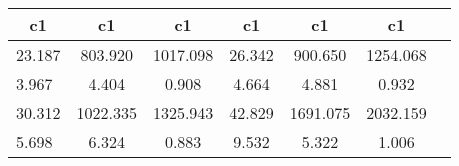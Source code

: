 \begin{table}[htbp]
\begin{tabular}{lcccccc} \hline \hline
 \multicolumn{1}{c}{ c1 }  & c1  & c1  & c1  & c1  & c1  \\  \hline 
   23.187 &   803.920 &  1017.098 &    26.342 &   900.650 &  1254.068 \\  
    3.967 &     4.404 &     0.908 &     4.664 &     4.881 &     0.932 \\  
   30.312 &  1022.335 &  1325.943 &    42.829 &  1691.075 &  2032.159 \\  
    5.698 &     6.324 &     0.883 &     9.532 &     5.322 &     1.006 \\  
\hline \hline \end{tabular}
\end{table}
